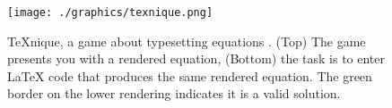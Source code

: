 \begin{figure}[H]
	\centering
	
	\texttt{[image: ./graphics/texnique.png]}

	\caption[A screenshot of TeXnique, a game about typesetting equations.]{TeXnique, a game about typesetting equations \cite{texnique}. (Top) The game presents you with a rendered equation, (Bottom) the task is to enter LaTeX code that produces the same rendered equation. The green border on the lower rendering indicates it is a valid solution.}
	
	\label{fig:texnique}
\end{figure}